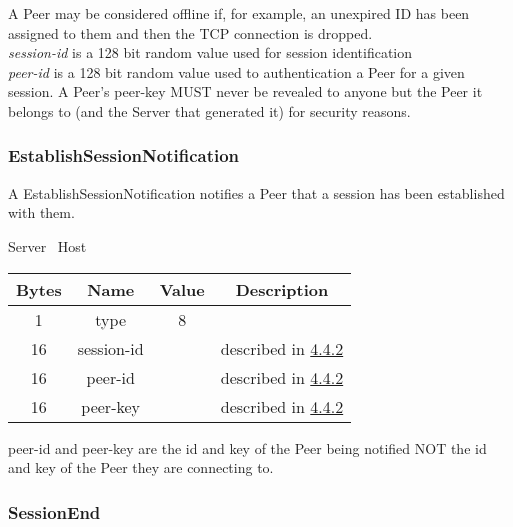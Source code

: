 A Peer may be considered offline if, for example, an unexpired ID has been assigned to them and then the TCP
connection is dropped.\\

\emph{session-id} is a 128 bit random value used for session identification\\

\emph{peer-id} is a 128 bit random value used to authentication a Peer for a given session. A Peer's peer-key MUST
never be revealed to anyone but the Peer it belongs to (and the Server that generated it)
for security reasons.\\

\subsubsection{EstablishSessionNotification}

A EstablishSessionNotification notifies a Peer that a session has been established with them.

\begin{center}
    Server \textrightarrow\ Host\\
    \begin{tabular}{|c|c|c|c|}
        \hline
        \textbf{Bytes} & \textbf{Name} & \textbf{Value} & \textbf{Description}                                \\
        \hline
        1              & type          & 8              &                                                     \\
        \hline
        16             & session-id    &                & described in \hyperlink{subsubsection.4.4.2}{4.4.2} \\
        \hline
        16             & peer-id       &                & described in \hyperlink{subsubsection.4.4.2}{4.4.2} \\
        \hline
        16             & peer-key      &                & described in \hyperlink{subsubsection.4.4.2}{4.4.2} \\
        \hline
    \end{tabular}
\end{center}

peer-id and peer-key are the id and key of the Peer being notified NOT the id and key of the Peer they are connecting
to.

\subsubsection{SessionEnd}


